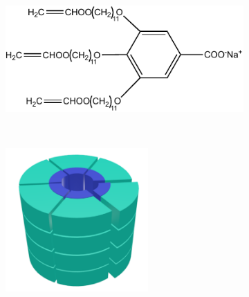 \documentclass{article}
\begin{document}
  \begin{figure}[!htb]
      \centering
      \begin{subfigure}{.325\textwidth}
              \centering
              \vspace{0.5cm}
              \includegraphics[width=\textwidth]{NaGA3C11.pdf}  %
              \vspace{0.05cm}
              \caption{}~\label{fig:monomer}
      \end{subfigure}
              \begin{subfigure}{0.325\linewidth}
              \centering
              \includegraphics[width=0.6\textwidth]{columns.pdf}

\end{subfigure}
\end{figure}
\end{document}
